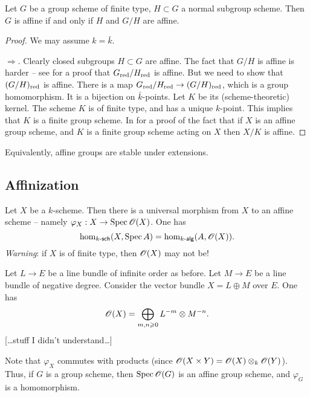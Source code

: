 \documentclass{article}
\begin{document}
\begin{proposition}
Let $G$ be a group scheme of finite type, $H\subset G$ a normal subgroup 
scheme. Then $G$ is affine if and only if $H$ and $G/H$ are affine. 
\end{proposition}
\begin{proof}
We may assume $k=\bar k$. 

$\Rightarrow$. Clearly closed subgroups $H\subset G$ are affine. The fact that 
$G/H$ is affine is harder -- see \cite{b91} for a proof that 
$G_{\mathrm{red}}/H_{\mathrm{red}}$ is affine. But we need to show that 
$(G/H)_{\mathrm{red}}$ is affine. There is a map 
$G_{\mathrm{red}}/H_{\mathrm{red}} \to (G/H)_{\mathrm{red}}$, which is a group homomorphism. 
It is a bijection on $\bar k$-points. Let $K$ be its (scheme-theoretic) 
kernel. The scheme $K$ is of finite type, and has a unique $k$-point. This 
implies that $K$ is a finite group scheme. In \cite{m08} for a proof of the 
fact that if $X$ is an affine group scheme, and $K$ is a finite group scheme acting 
on $X$ then $X/K$ is affine. 
\end{proof}

Equivalently, affine groups are stable under extensions. 


\subsection{Affinization}

Let $X$ be a $k$-scheme. Then there is a universal morphism from $X$ to an affine 
scheme -- namely $\varphi_X:X \to \operatorname{Spec} \mathscr{O}(X)$. One has 
\[
  \hom_{k\textnormal{-}\mathsf{sch}}(X,\operatorname{Spec} A) = \hom_{k\textnormal{-}\mathsf{alg}}(A,\mathscr{O}(X)) .
\]
\emph{Warning}: if $X$ is of finite type, then $\mathscr{O}(X)$ may not be!

\begin{example}
Let $L\to E$ be a line bundle of infinite order as before. Let $M \to E$ be a 
line bundle of negative degree. Consider the vector bundle 
$X=L\oplus M$ over $E$. One has 
\[
  \mathscr{O}(X) = \bigoplus_{m,n\geqslant 0} L^{-m} \otimes M^{-n} .
\]
[\ldots stuff I didn't understand\ldots]
\end{example}

Note that $\varphi_X$ commutes with products (since 
$\mathscr{O}(X\times Y) = \mathscr{O}(X)\otimes_k \mathscr{O}(Y)$). Thus, if $G$ is a group scheme, then 
$\operatorname{Spec} \mathscr{O}(G)$ is an affine group scheme, and $\varphi_G$ is a homomorphism. 
\end{document}
